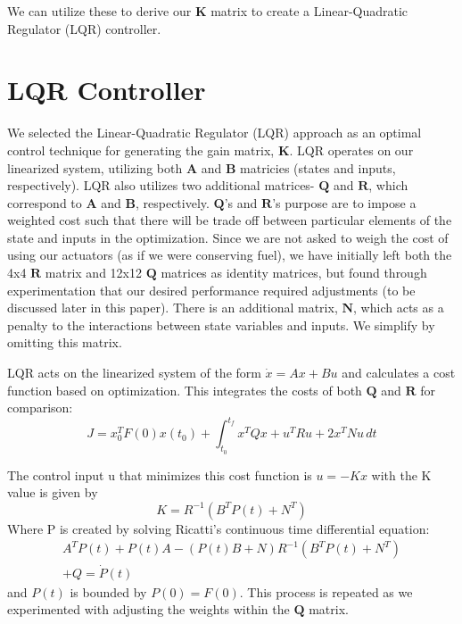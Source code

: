 \documentclass{article}
\begin{document}
\begin{multicols}{2}
We can utilize these to derive our $\boldsymbol{K}$ matrix to create a Linear-Quadratic Regulator (LQR) controller.

\section*{LQR Controller}
We selected the Linear-Quadratic Regulator (LQR) approach as an optimal control technique for generating the gain matrix, $
\boldsymbol{K}$.  LQR operates on our linearized system, utilizing both $\boldsymbol{A}$ and $\boldsymbol{B}$ matricies (states 
and inputs, respectively). LQR also utilizes two additional matrices- $\boldsymbol{Q}$ and $\boldsymbol{R}$, which correspond to $
\boldsymbol{A}$ and $\boldsymbol{B}$, respectively. $\boldsymbol{Q}$'s and $\boldsymbol{R}$'s purpose are to impose a weighted 
cost such that there will be trade off between particular elements of the state and inputs in the optimization. Since we are not asked 
to weigh the cost of using our actuators (as if we were conserving fuel), we have initially left both the  4x4 $\boldsymbol{R}$ matrix 
and 12x12 $\boldsymbol{Q}$ matrices as identity matrices, but found through experimentation that our 
desired performance required adjustments (to be discussed later in this paper). There is an additional matrix, $\boldsymbol{N}$, 
which acts as a penalty to the interactions between state variables and inputs.  We simplify by omitting this matrix.

LQR acts on the linearized system of the form $\dot{x} = Ax + Bu$ and calculates a cost function based on optimization.  This 
integrates the costs of both $\boldsymbol{Q}$ and $\boldsymbol{R}$ for comparison:
\begin{equation}
J =x_0^TF(0)x(t_0) +  \int_{t_0}^{t_f} x^TQx+u^TRu +2x^TNu\,dt 
\end{equation}

The control input u that minimizes this cost function is $u= -Kx$ with the K value is given by
\begin{equation}
K = R^{-1}(B^TP(t) + N^T)
\end{equation}
\noindent
Where P is created by solving Ricatti's continuous time differential equation:
\begin{align}
A^TP(t) + P(t)A - (P(t)B + N)R^{-1}(B^TP(t) + N^T) \nonumber\\+ Q = \dot{P}(t)
\end{align}
\noindent
and $P(t)$ is bounded by $P(0) = F(0)$. This process is repeated as we experimented with adjusting the weights within the $
\boldsymbol{Q}$ matrix.


\end{multicols}
\end{document}
